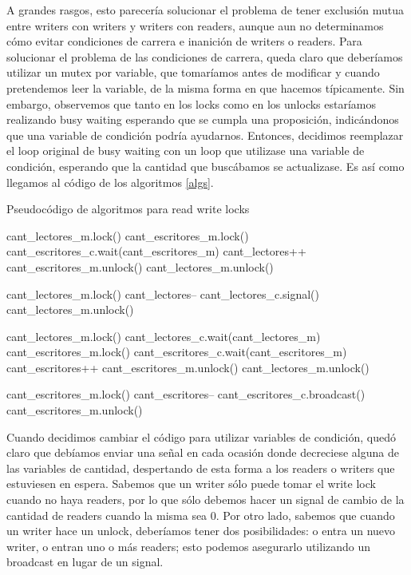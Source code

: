 \documentclass{article}
\begin{document}
A grandes rasgos, esto parecería solucionar el problema de tener exclusión mutua entre writers con writers y writers con readers, aunque aun no determinamos cómo evitar condiciones de carrera e inanición de writers o readers. Para solucionar el problema de las condiciones de carrera, queda claro que deberíamos utilizar un mutex por variable, que tomaríamos antes de modificar y cuando pretendemos leer la variable, de la misma forma en que hacemos típicamente. Sin embargo, observemos que tanto en los locks como en los unlocks estaríamos realizando busy waiting esperando que se cumpla una proposición, indicándonos que una variable de condición podría ayudarnos. Entonces, decidimos reemplazar el loop original de busy waiting con un loop que utilizase una variable de condición, esperando que la cantidad que buscábamos se actualizase. Es así como llegamos al código de los algoritmos \ref{algs}.

\begin{algorithm}[h!]
\caption{Pseudocódigo de algoritmos para read write locks}
\label{algs}
\begin{algorithmic}
    \State cant_lectores_m.lock()
    \State cant_escritores_m.lock()
        \State cant_escritores_c.wait(cant_escritores_m)
    \EndWhile
    \State cant_lectores++
    \State cant_escritores_m.unlock()
    \State cant_lectores_m.unlock()
\EndFunction

    \State cant_lectores_m.lock()
    \State cant_lectores--
        \State cant_lectores_c.signal()
    \EndIf
    \State cant_lectores_m.unlock()
\EndFunction

    \State cant_lectores_m.lock()
        \State cant_lectores_c.wait(cant_lectores_m)
    \EndWhile
    \State cant_escritores_m.lock()
        \State cant_escritores_c.wait(cant_escritores_m)
    \EndWhile
    \State cant_escritores++
    \State cant_escritores_m.unlock()
    \State cant_lectores_m.unlock()
\EndFunction

    \State cant_escritores_m.lock()
    \State cant_escritores--
    \State cant_escritores_c.broadcast()
    \State cant_escritores_m.unlock()
\EndFunction
\end{algorithmic}
\end{algorithm}

Cuando decidimos cambiar el código para utilizar variables de condición, quedó claro que debíamos enviar una señal en cada ocasión donde decreciese alguna de las variables de cantidad, despertando de esta forma a los readers o writers que estuviesen en espera. Sabemos que un writer sólo puede tomar el write lock cuando no haya readers, por lo que sólo debemos hacer un signal de cambio de la cantidad de readers cuando la misma sea 0. Por otro lado, sabemos que cuando un writer hace un unlock, deberíamos tener dos posibilidades: o entra un nuevo writer, o entran uno o más readers; esto podemos asegurarlo utilizando un broadcast en lugar de un signal.\par\smallbreak
\end{document}

